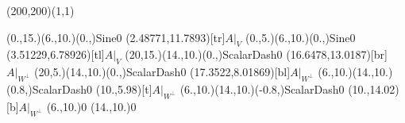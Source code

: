 \unitlength=1bp%

\begin{feynartspicture}(200,200)(1,1)

\FADiagram{}
\FAProp(0.,15.)(6.,10.)(0.,){Sine}{0}
\FALabel(2.48771,11.7893)[tr]{$A|_V$}
\FAProp(0.,5.)(6.,10.)(0.,){Sine}{0}
\FALabel(3.51229,6.78926)[tl]{$A|_V$}
\FAProp(20,15.)(14.,10.)(0.,){ScalarDash}{0}
\FALabel(16.6478,13.0187)[br]{$A|_{W^\perp}$}
\FAProp(20,5.)(14.,10.)(0.,){ScalarDash}{0}
\FALabel(17.3522,8.01869)[bl]{$A|_{W^\perp}$}
\FAProp(6.,10.)(14.,10.)(0.8,){ScalarDash}{0}
\FALabel(10.,5.98)[t]{$A|_{W^\perp}$}
\FAProp(6.,10.)(14.,10.)(-0.8,){ScalarDash}{0}
\FALabel(10.,14.02)[b]{$A|_{W^\perp}$}
\FAVert(6.,10.){0}
\FAVert(14.,10.){0}
\end{feynartspicture}

